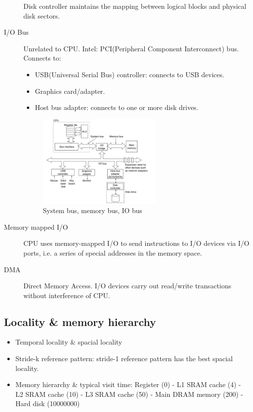\begin{description}
Disk controller maintains the mapping between logical blocks and physical disk sectors. 

\item[I/O Bus] Unrelated to CPU. Intel: PCI(Peripheral Component Interconnect) bus. Connects to:
\begin{itemize}
	\item USB(Universal Serial Bus) controller: connects to USB devices.
	\item Graphics card/adapter.
	\item Host bus adapter: connects to one or more disk drives.
\end{itemize}
\begin{figure}[ht]
\centering
\includegraphics[width=0.6\textwidth]{iobus.pdf}
\caption{System bus, memory bus, IO bus}
\end{figure}
\item[Memory mapped I/O]CPU uses memory-mapped I/O to send instructions to I/O devices via I/O ports, i.e. a series of special addresses in the memory space.
\item[DMA]Direct Memory Access. I/O devices carry out read/write transactions without interference of CPU. 
\end{description}
\subsection{Locality \& memory hierarchy}
\begin{itemize}
	\item Temporal locality \& spacial locality
	\item Stride-k reference pattern: stride-1 reference pattern has the best spacial locality.
	\item Memory hierarchy \& typical visit time: Register (0) - L1 SRAM cache (4) - L2 SRAM cache (10) - L3 SRAM cache (50) - Main DRAM memory (200) - Hard disk (10000000) 
\end{itemize}
